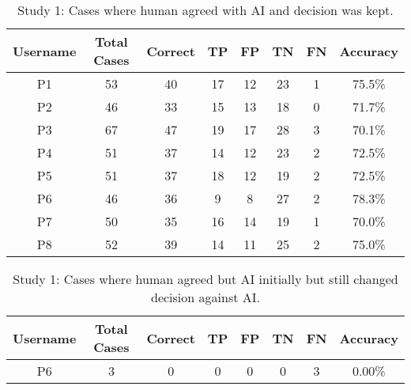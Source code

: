 



\begin{table}[]
\caption{
Study 1: Cases where human agreed with AI and decision was kept.
}
\begin{tabular}{@{}cccccccc@{}}
\toprule
\textbf{Username} & \textbf{Total Cases} &  \textbf{Correct} & \textbf{TP} & \textbf{FP} & \textbf{TN} & \textbf{FN} & \textbf{Accuracy} \\
\midrule
P1   & 53             & 40               & 17          & 12          & 23          & 1           & 75.5\%     \\
P2  & 46             & 33               & 15          & 13          & 18          & 0           & 71.7\%     \\
P3         & 67             & 47               & 19          & 17          & 28          & 3           & 70.1\%     \\
P4   & 51             & 37               & 14          & 12          & 23          & 2           & 72.5\%     \\
P5    & 51             & 37               & 18          & 12          & 19          & 2           & 72.5\%     \\
P6    & 46             & 36               & 9           & 8           & 27          & 2           & 78.3\%     \\
P7      & 50             & 35               & 16          & 14          & 19          & 1           & 70.0\%    \\
P8 & 52             & 39               & 14          & 11          & 25          & 2           & 75.0\%     \\ \bottomrule
\end{tabular}
\label{tab:study1-fine-1}
\end{table}




\begin{table}[]
\caption{Study 1: Cases where human agreed but AI initially but still changed decision against AI.}
\begin{tabular}{@{}cccccccc@{}}
\toprule
\textbf{Username} & \textbf{Total Cases} &  \textbf{Correct} & \textbf{TP} & \textbf{FP} & \textbf{TN} & \textbf{FN} & \textbf{Accuracy} \\
\midrule
 P6       & 3                    & 0                    & 0                    & 0                    & 0                    & 3                    & 0.00\%                  \\
                \bottomrule
\end{tabular}
\label{tab:study1-fine-2}
\end{table}

